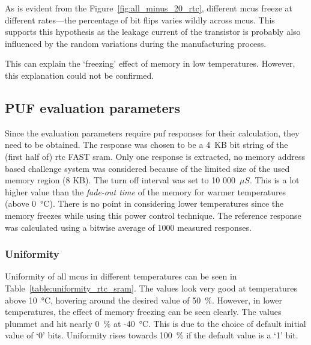 As is evident from the Figure~\ref{fig:all_minus_20_rtc}, different \glspl{mcu} freeze at different rates---the percentage of bit flips varies wildly across \glspl{mcu}. This supports this hypothesis as the leakage current of the transistor is probably also influenced by the random variations during the manufacturing process.

This can explain the `freezing' effect of memory in low temperatures. However, this explanation could not be confirmed.

\subsection{PUF evaluation parameters}\label{sec:rtc_evaluation}

Since the evaluation parameters require \gls{puf} responses for their calculation, they need to be obtained. The response was chosen to be a 4~KB bit string of the (first half of) \gls{rtc} FAST \gls{sram}. Only one response is extracted, no memory address based challenge system was considered because of the limited size of the used memory region (8 KB). The turn off interval was set to 10 000~$\mu{}S$. This is a lot higher value than the \emph{fade-out time} of the memory for warmer temperatures (above 0~°C). There is no point in considering lower temperatures since the memory freezes while using this power control technique. The reference response was calculated using a bitwise average of 1000 measured responses.

\subsubsection*{Uniformity}

Uniformity of all \glspl{mcu} in different temperatures can be seen in Table~\ref{table:uniformity_rtc_sram}. The values look very good at temperatures above 10~°C, hovering around the desired value of 50~\%. However, in lower temperatures, the effect of memory freezing can be seen clearly. The values plummet and hit nearly 0~\% at -40~°C. This is due to the choice of default initial value of `0' bits. Uniformity rises towards 100~\% if the default value is a `1' bit.

